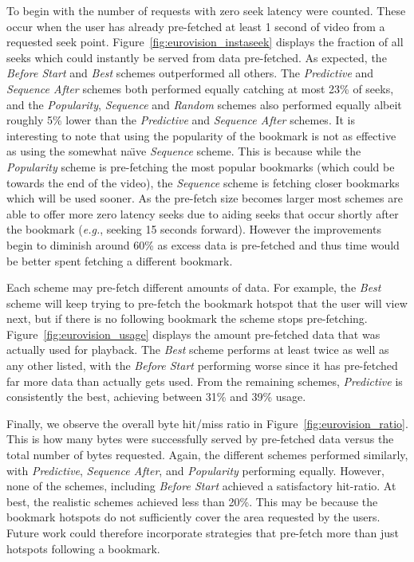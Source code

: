 \documentclass[a4paper,11pt]{article}
\begin{document}
To begin with the number of requests with zero seek latency were counted. These occur when the user has already pre-fetched at least 1 second of video from a requested seek point. Figure~\ref{fig:eurovision_instaseek} displays the fraction of all seeks which could instantly be served from data pre-fetched. As expected, the \emph{Before Start} and \emph{Best} schemes outperformed all others. The \emph{Predictive} and \emph{Sequence After} schemes both performed equally catching at most 23\% of seeks, and the \emph{Popularity}, \emph{Sequence} and \emph{Random} schemes also performed equally albeit roughly 5\% lower than the \emph{Predictive} and \emph{Sequence After} schemes.
It is interesting to note that using the popularity of the bookmark is not as effective as using the somewhat na\"{\i}ve \emph{Sequence} scheme. This is because while the \emph{Popularity} scheme is pre-fetching the most popular bookmarks (which could be towards the end of the video), the \emph{Sequence} scheme is fetching closer bookmarks which will be used sooner.
As the pre-fetch size becomes larger most schemes are able to offer more zero latency seeks due to aiding seeks that occur shortly after the bookmark (\emph{e.g.}, seeking 15 seconds forward). However the improvements begin to diminish around 60\% as excess data is pre-fetched and thus time would be better spent fetching a different bookmark.

Each scheme may pre-fetch different amounts of data. For example, the \emph{Best} scheme will keep trying to pre-fetch the bookmark hotspot that the user will view next, but if there is no following bookmark the scheme stops pre-fetching. Figure~\ref{fig:eurovision_usage} displays the amount pre-fetched data that was actually used for playback. The \emph{Best} scheme performs at least twice as well as any other listed, with the \emph{Before Start} performing worse since it has pre-fetched far more data than actually gets used. From the remaining schemes, \emph{Predictive} is consistently the best, achieving between 31\% and 39\% usage.

Finally, we observe the overall byte hit/miss ratio in Figure~\ref{fig:eurovision_ratio}. This is how many bytes were successfully served by pre-fetched data versus the total number of bytes requested. Again, the different schemes performed similarly, with \emph{Predictive}, \emph{Sequence After}, and \emph{Popularity} performing equally. However, none of the schemes, including \emph{Before Start} achieved a satisfactory hit-ratio. At best, the realistic schemes achieved less than 20\%. This may be because the bookmark hotspots do not sufficiently cover the area requested by the users. Future work could therefore incorporate strategies that pre-fetch more than just hotspots following a bookmark.
\end{document}
